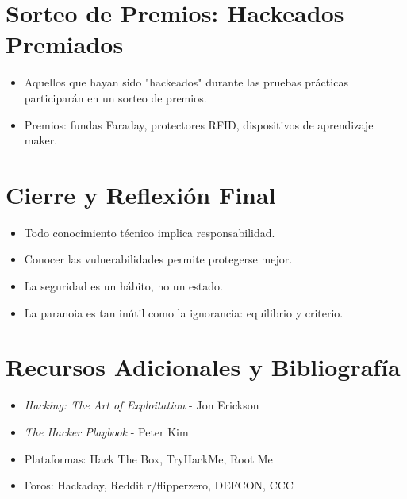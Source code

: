 \documentclass[a4paper,12pt]{article}
\begin{document}
\section{Sorteo de Premios: Hackeados Premiados}

\begin{itemize}
    \item Aquellos que hayan sido "hackeados" durante las pruebas prácticas participarán en un sorteo de premios.
    \item Premios: fundas Faraday, protectores RFID, dispositivos de aprendizaje maker.
\end{itemize}

\section{Cierre y Reflexión Final}

\begin{itemize}
    \item Todo conocimiento técnico implica responsabilidad.
    \item Conocer las vulnerabilidades permite protegerse mejor.
    \item La seguridad es un hábito, no un estado.
    \item La paranoia es tan inútil como la ignorancia: equilibrio y criterio.
\end{itemize}

\section{Recursos Adicionales y Bibliografía}

\begin{itemize}
    \item \textit{Hacking: The Art of Exploitation} - Jon Erickson
    \item \textit{The Hacker Playbook} - Peter Kim
    \item Plataformas: Hack The Box, TryHackMe, Root Me
    \item Foros: Hackaday, Reddit r/flipperzero, DEFCON, CCC
\end{itemize}
\end{document}
